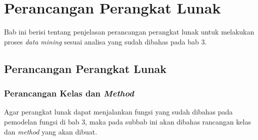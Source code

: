 \chapter{Perancangan Perangkat Lunak}

Bab ini berisi tentang penjelasan perancangan perangkat lunak untuk melakukan proses \textsl{data mining} sesuai analisa yang sudah dibahas pada bab 3.

\section{Perancangan Perangkat Lunak}

\subsection{Perancangan Kelas dan \textsl{Method}}
Agar perangkat lunak dapat menjalankan fungsi yang sudah dibahas pada pemodelan fungsi di bab 3, maka pada subbab ini akan dibahas rancangan kelas dan \textsl{method} yang akan dibuat.

